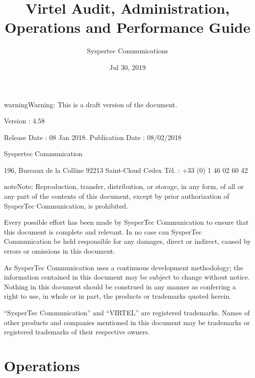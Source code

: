 \documentclass[letterpaper,10pt,english]{sphinxmanual}
\title{Virtel Audit, Administration, Operations and Performance Guide}
\date{Jul 30, 2019}
\author{Syspertec Communications}
\begin{document}
\pagestyle{empty}
\sphinxmaketitle
\pagestyle{plain}
\sphinxtableofcontents
\pagestyle{normal}
\label{\detokenize{audit_operations_ and_performance::doc}}




\begin{sphinxadmonition}{warning}{Warning:}
This is a draft version of the document.
\end{sphinxadmonition}

Version : 4.58

Release Date : 08 Jan 2018. Publication Date : 08/02/2018

Syspertec Communication

196, Bureaux de la Colline 92213 Saint-Cloud Cedex Tél. : +33 (0) 1 46 02 60 42


\begin{sphinxadmonition}{note}{Note:}
Reproduction, transfer, distribution, or storage, in any form, of all or any part of
the contents of this document, except by prior authorization of SysperTec
Communication, is prohibited.

Every possible effort has been made by SysperTec Communication to ensure that this document
is complete and relevant. In no case can SysperTec Communication be held responsible for
any damages, direct or indirect, caused by errors or omissions in this document.

As SysperTec Communication uses a continuous development methodology; the information
contained in this document may be subject to change without notice. Nothing in this
document should be construed in any manner as conferring a right to use, in whole or in
part, the products or trademarks quoted herein.

“SysperTec Communication” and “VIRTEL” are registered trademarks. Names of other products
and companies mentioned in this document may be trademarks or registered trademarks of
their respective owners.
\end{sphinxadmonition}


\chapter{Operations}
\label{\detokenize{audit_operations_ and_performance:operations}}\label{\detokenize{audit_operations_ and_performance:v458ap-introduction}}
\ignorespaces 
\end{document}
